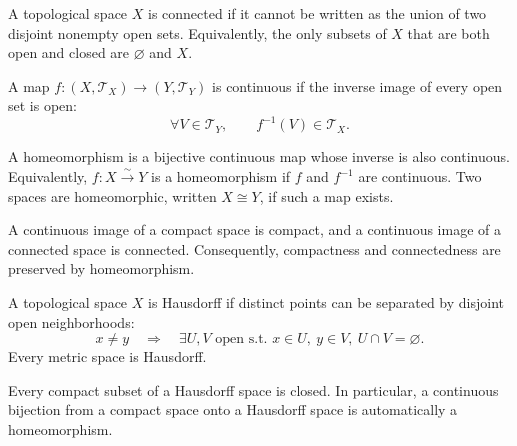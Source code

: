     \begin{definition}[Connectedness]
        A topological space $X$ is connected if it cannot be written as the union
        of two disjoint nonempty open sets. Equivalently, the only subsets of
        $X$ that are both open and closed are $\varnothing$ and $X$.
    \end{definition}


    \begin{definition}
        A map $f:(X,\mathcal{T}_X)\to(Y,\mathcal{T}_Y)$ is continuous if the
        inverse image of every open set is open:
        \[
            \forall V\in\mathcal{T}_Y,
            \qquad
            f^{-1}(V)\in\mathcal{T}_X.
        \]
    \end{definition}

    \begin{definition}[Homeomorphism]
        A homeomorphism is a bijective continuous map whose inverse is also
        continuous. Equivalently, $f:X\xrightarrow{\sim}Y$ is a homeomorphism
        if $f$ and $f^{-1}$ are continuous. Two spaces are homeomorphic, written
        $X\cong Y$, if such a map exists.
    \end{definition}


    \begin{theorem}
        A continuous image of a compact space is compact, and a continuous
        image of a connected space is connected. Consequently, compactness and
        connectedness are preserved by homeomorphism.
    \end{theorem}

    \begin{definition}
        A topological space $X$ is Hausdorff if distinct points can be separated
        by disjoint open neighborhoods:
        \[
            x\neq y
            \quad\Longrightarrow\quad
            \exists U,V\text{ open s.t. }x\in U,\ y\in V,\ U\cap V=\varnothing.
        \]
        Every metric space is Hausdorff.
    \end{definition}

    \begin{theorem}
        Every compact subset of a Hausdorff space is closed. In particular, a
        continuous bijection from a compact space onto a Hausdorff space is
        automatically a homeomorphism.
    \end{theorem}

